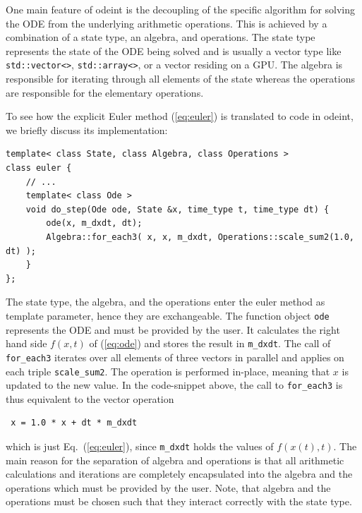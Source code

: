 \documentclass[final]{siamltex}
\newcommand{\code}[1]{\lstinline|#1|}
\newcommand{\eqref}[1]{(\ref{#1})}
\begin{document}
One main feature of odeint is the decoupling of the specific algorithm
for solving the ODE from the underlying arithmetic operations. This
is achieved by a combination of a state type, an algebra, and
operations. The state type represents the state of the ODE being
solved and is usually a vector type like \code{std::vector<>},
\code{std::array<>}, or a vector residing on a GPU. The algebra is
responsible for iterating through all elements of the state whereas
the operations are responsible for the elementary operations.

To see how the explicit Euler method \eqref{eq:euler} is translated to
code in odeint, we briefly discuss its implementation:
\begin{lstlisting}
template< class State, class Algebra, class Operations >
class euler {
    // ...
    template< class Ode >
    void do_step(Ode ode, State &x, time_type t, time_type dt) {
        ode(x, m_dxdt, dt);
        Algebra::for_each3( x, x, m_dxdt, Operations::scale_sum2(1.0, dt) );
    }
};
\end{lstlisting}
The state type, the algebra, and the operations enter the euler method  %
as template parameter, hence they are exchangeable. The function object
\code{ode} represents the ODE and must be provided by the user. It calculates
the right hand side $f(x,t)$ of \eqref{eq:ode} and stores the result in
\code{m_dxdt}. The call of \code{for_each3} iterates over all elements of three vectors in parallel and    %
applies on each triple \code{scale_sum2}. The operation is performed
in-place, meaning that $x$ is updated to the new value. 
In the code-snippet above, the call to \code{for_each3} is thus equivalent to the vector operation
\begin{lstlisting}
 x = 1.0 * x + dt * m_dxdt
\end{lstlisting}
which is just Eq.~\eqref{eq:euler}, since \code{m_dxdt} holds the values of $f(x(t), t)$.
The main reason for the separation of algebra and operations is that all arithmetic calculations and
iterations are completely encapsulated into the algebra and the
operations which must be provided by the user. Note, that algebra and
the operations must be chosen such that they interact correctly with
the state type.
\end{document}
